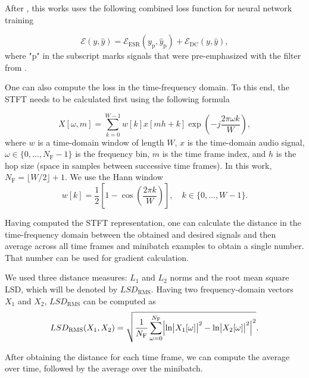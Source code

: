 After \cite{Wright2019a,Wright2020,Wright2019}, this works uses the following combined loss function for neural network training

\begin{equation}
  \mathcal{E}(y, \hat{y}) = \mathcal{E}_\text{ESR}(y_\text{p}, \hat{y}_\text{p}) + \mathcal{E}_\text{DC}(y, \hat{y}),
  \label{eq:final_loss_function}
\end{equation}
where "p" in the subscript marks signals that were pre-emphasized with the filter from .

One can also compute the loss in the time-frequency domain. To this end, the \ac{STFT} needs to be calculated first using the following formula \cite{Pytorch}

\begin{equation}
  X[\omega, m] = \sum \limits_{k=0}^{W-1} w[k] x[mh + k] \exp \left( -j\frac{2\pi \omega k}{W} \right),
\end{equation}
where $w$ is a time-domain window of length $W$, $x$ is the time-domain audio signal, $\omega \in \{0, \dots, N_\text{F}-1\}$ is the frequency bin, $m$ is the time frame index, and $h$ is the hop size (space in samples between successive time frames). In this work, $N_\text{F} = \lfloor W / 2 \rfloor + 1$. We use the Hann window \cite{Oppenheim2010}
\begin{equation}
  w[k] = \frac{1}{2} \left[ 1 - \cos \left( \frac{2\pi k}{W} \right) \right], \quad k \in \{0, \dots, W-1\}.
\end{equation}

Having computed the \ac{STFT} representation, one can calculate the distance in the time-frequency domain between the obtained and desired signals and then average across all time frames and minibatch examples to obtain a single number. That number can be used for gradient calculation.

We used three distance measures: $L_1$ and $L_2$ norms and the root mean square \ac{LSD}, which will be denoted by $LSD_\text{RMS}$. Having two frequency-domain vectors $X_1$ and $X_2$, $LSD_\text{RMS}$ can be computed as \cite{Gray1976}
\begin{equation}
  LSD_\text{RMS}(X_1, X_2) = \sqrt{ \frac{1}{N_\text{F}} \sum \limits_{\omega=0}^{N_\text{F}} \Bigl\lvert \ln \bigl\lvert X_1[\omega]\bigr\rvert^2 - \ln \bigl\lvert X_2[\omega]\bigr\rvert^2 \Bigr\rvert^2}.
  \label{eq:log_spectral_distance}
\end{equation}

After obtaining the distance for each time frame, we can compute the average over time, followed by the average over the minibatch.

